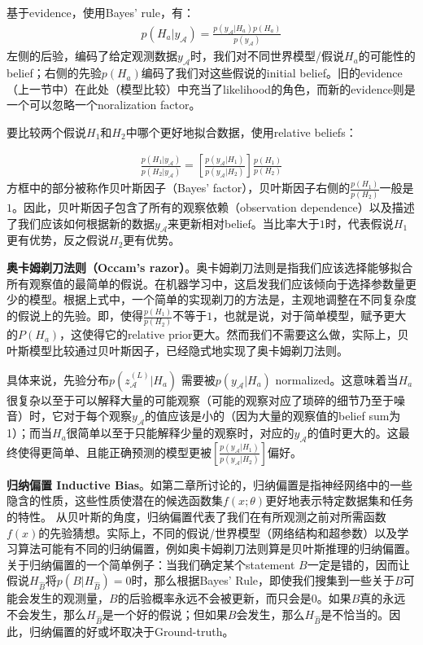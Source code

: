 基于evidence，使用Bayes' rule，有：
\begin{equation}
    \begin{split}
        p(H_a|y_{\mathcal{A}}) = \frac{p(y_{\mathcal{A}}|H_a)p(H_a)}{p(y_{\mathcal{A}})}
    \end{split}
\end{equation}
左侧的后验，编码了给定观测数据$y_{\mathcal{A}}$时，我们对不同世界模型/假说$H_a$的可能性的belief；右侧的先验$p(H_a)$编码了我们对这些假说的initial belief。旧的evidence（上一节中）在此处（模型比较）中充当了likelihood的角色，而新的evidence则是一个可以忽略一个noralization factor。

要比较两个假说$H_1$和$H_2$中哪个更好地拟合数据，使用relative beliefs：

\begin{equation}
    \begin{split}
        \frac{p(H_1|y_{\mathcal{A}})}{p(H_2|y_{\mathcal{A}})} = \left[\frac{p(y_\mathcal{A}|H_1)}{p(y_\mathcal{A}|H_2)}\right] \frac{p(H_1)}{p(H_2)}
    \end{split}
\end{equation}
方框中的部分被称作贝叶斯因子（Bayes' factor），贝叶斯因子右侧的$\frac{p(H_1)}{p(H_2)}$一般是$1$。因此，贝叶斯因子包含了所有的观察依赖（observation dependence）以及描述了我们应该如何根据新的数据$y_{\mathcal{A}}$来更新相对belief。当比率大于$1$时，代表假说$H_1$更有优势，反之假说$H_2$更有优势。

\textbf{奥卡姆剃刀法则（Occam's razor）}。奥卡姆剃刀法则是指我们应该选择能够拟合所有观察值的最简单的假说。在机器学习中，这启发我们应该倾向于选择参数量更少的模型。根据上式中，一个简单的实现剃刀的方法是，主观地调整在不同复杂度的假说上的先验。即，使得$\frac{p(H_1)}{p(H_2)}$不等于$1$，也就是说，对于简单模型，赋予更大的$P(H_a)$，这使得它的relative prior更大。然而我们不需要这么做，实际上，贝叶斯模型比较通过贝叶斯因子，已经隐式地实现了奥卡姆剃刀法则。

具体来说，先验分布$p(z_\mathcal{A}^{(L)}|H_a)$ 需要被$p(y_\mathcal{A}|H_a)$ normalized。这意味着当$H_a$很复杂以至于可以解释大量的可能观察（可能的观察对应了琐碎的细节乃至于噪音）时，它对于每个观察$y_\mathcal{A}$的值应该是小的（因为大量的观察值的belief sum为1）；而当$H_a$很简单以至于只能解释少量的观察时，对应的$y_\mathcal{A}$的值时更大的。这最终使得更简单、且能正确预测的模型更被$\left[\frac{p(y_\mathcal{A}|H_1)}{p(y_\mathcal{A}|H_2)}\right]$偏好。

\textbf{归纳偏置 Inductive Bias}。如第二章所讨论的，归纳偏置是指神经网络中的一些隐含的性质，这些性质使潜在的候选函数集${f(x;\theta)}$更好地表示特定数据集和任务的特性。 从贝叶斯的角度，归纳偏置代表了我们在有所观测之前对所需函数$f(x)$的先验猜想。实际上，不同的假说/世界模型（网络结构和超参数）以及学习算法可能有不同的归纳偏置，例如奥卡姆剃刀法则算是贝叶斯推理的归纳偏置。关于归纳偏置的一个简单例子：当我们确定某个statement $B$一定是错的，因而让假说$H_{\hat{B}}$将$p(B|H_{\hat{B}})=0$时，那么根据Bayes' Rule，即使我们搜集到一些关于$B$可能会发生的观测量，$B$的后验概率永远不会被更新，而只会是$0$。如果$B$真的永远不会发生，那么$H_{\hat{B}}$是一个好的假说；但如果$B$会发生，那么$H_{\hat{B}}$是不恰当的。因此，归纳偏置的好或坏取决于Ground-truth。



